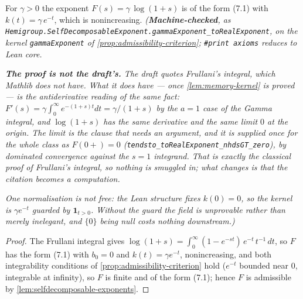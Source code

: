 \begin{proposition}\label{prop:gamma-family}
\leanok
For $\gamma > 0$ the exponent $F(s) = \gamma\,\log(1 + s)$ is of the form (7.1) with
$k(t) = \gamma\, e^{-t}$, which is nonincreasing.
\statusT\quad\emph{(\textbf{Machine-checked}, as
\texttt{Hemigroup.SelfDecomposableExponent.gammaExponent\_toRealExponent}, on the kernel
\texttt{gammaExponent} of \ref{prop:admissibility-criterion}; \texttt{\#print axioms} reduces to
Lean core.}

\emph{\textbf{The proof is not the draft's.} The draft quotes Frullani's integral, which Mathlib
does not have. What it does have --- once \ref{lem:memory-kernel} is proved --- is the
antiderivative reading of the same fact: $F' (s) = \gamma\!\int_0^\infty e^{-(1+s)t}dt =
\gamma/(1+s)$ by the $a=1$ case of the Gamma integral, and $\log(1+s)$ has the same derivative
and the same limit $0$ at the origin. The limit is the clause that needs an argument, and it is
supplied once for the whole class as $F(0{+}) = 0$
(\texttt{tendsto\_toRealExponent\_nhdsGT\_zero}), by dominated convergence against the $s=1$
integrand. That is exactly the classical proof of Frullani's integral, so nothing is smuggled in;
what changes is that the citation becomes a computation.}

\emph{One normalisation is not free: the Lean structure fixes $k(0) = 0$, so the kernel is
$\gamma e^{-t}$ guarded by $\mathbf{1}_{t>0}$. Without the guard the field is unprovable rather
than merely inelegant, and $\{0\}$ being null costs nothing downstream.)}
\end{proposition}

\begin{proof}
\leanok
The Frullani integral gives
$\log(1+s) = \int_0^\infty (1 - e^{-st})\,e^{-t}\,t^{-1}\,dt$, so $F$ has the form (7.1) with
$b_0 = 0$ and $k(t) = \gamma e^{-t}$, nonincreasing, and both integrability conditions of
\ref{prop:admissibility-criterion} hold ($e^{-t}$ bounded near $0$, integrable at infinity), so
$F$ is finite and of the form (7.1); hence $F$ is admissible by
\ref{lem:selfdecomposable-exponents}.
\end{proof}

